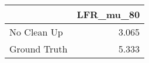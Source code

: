 \begin{tabular}{lr}
\toprule
{} & LFR_mu_80 \\
\midrule
No Clean Up  &     3.065 \\
Ground Truth &     5.333 \\
\bottomrule
\end{tabular}
